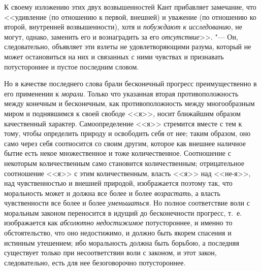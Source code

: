 К своему изложению этих двух возвышенностей Кант прибавляет замечание, что
<<удивление (по отношению к первой, внешней) и уважение (по отношению ко
второй, внутренней возвышенности), хотя и
{\em побуждают к исследованию}, не могут, однако,
заменить его и вознаградить за его
{\em отсутствие}>>. "--- Он, следовательно,
объявляет эти взлеты не удовлетворяющими разума, который не может
остановиться на них и связанных с ними чувствах и признавать потустороннее
и пустое последним словом.

Но в качестве последнего слова брали бесконечный прогресс преимущественно в
его применении к {\em морали}. Только что указанная
вторая противоположность между конечным и бесконечным, как
противоположность между многообразным миром и поднявшимся к своей свободе
<<я>>, носит ближайшим образом качественный характер. Самоопределение <<я>>
стремится вместе с тем к тому, чтобы определить природу и освободить себя
от нее; таким образом, оно само через себя соотносится со своим другим,
которое как внешнее наличное бытие есть некое множественное и тоже
количественное. Соотношение с некоторым количественным само становится
количественным; отрицательное соотношение <<я>> с этим количественным, власть
<<я>> над <<не-я>>, над чувственностью и внешней природой, изображается поэтому
так, что моральность может и должна все более и более
{\em возрастать}, а власть чувственности все более и
более {\em уменьшаться}. Но полное соответствие воли с
моральным законом переносится в идущий до бесконечности прогресс, т.~е.
изображается как {\em абсолютно недостижимое}
потустороннее, и именно то обстоятельство, что оно недостижимо, и должно
быть якорем спасения и истинным утешением; ибо моральность должна быть
борьбою, а последняя существует только при несоответствии воли с законом, и
этот закон, следовательно, есть для нее безоговорочно потустороннее.

